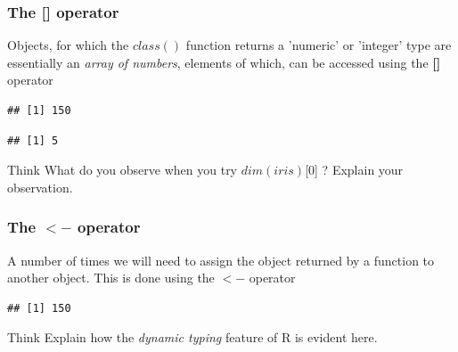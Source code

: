 \subsubsection{The [] operator}
\noindent Objects, for which the $class()$ function returns a 'numeric' or 'integer' type are essentially an \emph{array of numbers}, elements of which, can be accessed using the \textbf{[]} operator     
\begin{knitrout}
\color{fgcolor}\begin{kframe}
\begin{alltt}
\hlstd{(iris)[}\hlstd{]}
\end{alltt}
\begin{verbatim}
## [1] 150
\end{verbatim}
\begin{alltt}
\hlstd{(iris)[}\hlstd{]}
\end{alltt}
\begin{verbatim}
## [1] 5
\end{verbatim}
\end{kframe}
\end{knitrout}

\begin{DIY}{Think}
What do you observe when you try $dim(iris)$[0] ? Explain your observation. 
\end{DIY}

\subsubsection{The $<-$ operator}
\noindent A number of times we will need to assign the object returned by a function to another object. This is done using the $<-$ operator 
\begin{knitrout}
\color{fgcolor}\begin{kframe}
\begin{alltt}
 \hlkwb{<-} \hlstd{(iris)[}\hlstd{]}
\end{alltt}
\begin{verbatim}
## [1] 150
\end{verbatim}
\end{kframe}
\end{knitrout}

\begin{DIY}{Think}
Explain how the \emph{dynamic typing} feature of R is evident here. 
\end{DIY}

